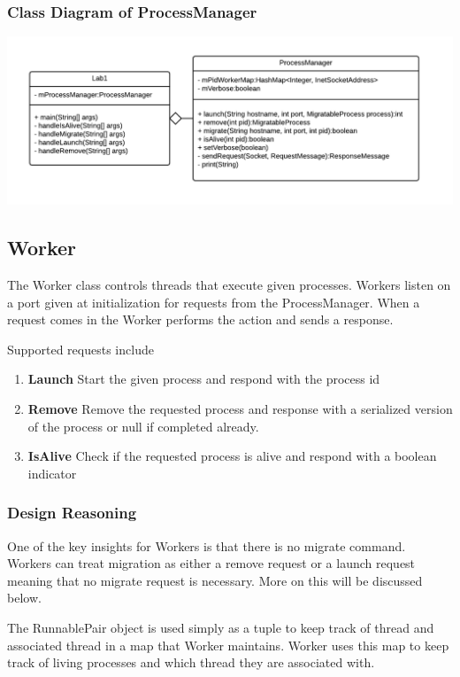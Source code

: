 \documentclass[12pt]{article}
\begin{document}
\subsubsection{Class Diagram of ProcessManager}
\includegraphics[scale=.4]{processManager.png}

\subsection{Worker}

The Worker class controls threads that execute given processes. Workers listen on a port given at initialization for requests from the ProcessManager. When a request comes in the Worker performs the action and sends a response.

Supported requests include
\begin{enumerate}
\item \textbf{Launch} Start the given process and respond with the process id
\item \textbf{Remove} Remove the requested process and response with a serialized version of the process or null if completed already.
\item \textbf{IsAlive} Check if the requested process is alive and respond with a boolean indicator
\end{enumerate}

\subsubsection{Design Reasoning}
One of the key insights for Workers is that there is no migrate command. Workers can treat migration as either a remove request or a launch request meaning that no migrate request is necessary. More on this will be discussed below.

The RunnablePair object is used simply as a tuple to keep track of thread and associated thread in a map that Worker maintains. Worker uses this map to keep track of living processes and which thread they are associated with.
\end{document}
